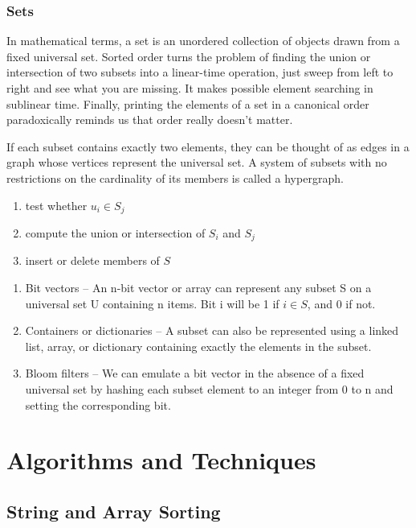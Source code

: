 \documentclass{article}
\begin{document}
    \subsubsection{Sets}
     In mathematical terms, a set is an unordered collection of objects drawn from a fixed universal set. Sorted order turns the problem of finding the union or intersection of two subsets into a linear-time operation, just sweep from left to right and see what you are missing. It makes possible element searching in sublinear time. Finally, printing the elements of a set in a canonical order paradoxically reminds us that order really doesn’t matter.
     
     If each subset contains exactly two elements, they can be thought of as edges in a graph whose vertices represent the universal set. A system of subsets with no restrictions on the cardinality of its members is called a hypergraph.
    
    \begin{enumerate}
        \item test whether $u_i \in S_j$
        \item compute the union or intersection of $S_i$ and $S_j$
        \item insert or delete members of $S$
    \end{enumerate}
    
    \begin{enumerate}
        \item Bit vectors – An n-bit vector or array can represent any subset S on a universal set U containing n items. Bit i will be 1 if $i \in S$, and $0$ if not.
        \item Containers or dictionaries – A subset can also be represented using a linked list, array, or dictionary containing exactly the elements in the subset.
        \item Bloom filters – We can emulate a bit vector in the absence of a fixed universal set by hashing each subset element to an integer from 0 to n and setting the corresponding bit.
    \end{enumerate}

\newpage    
\section{Algorithms and Techniques}
    \subsection{String and Array Sorting}
\end{document}
